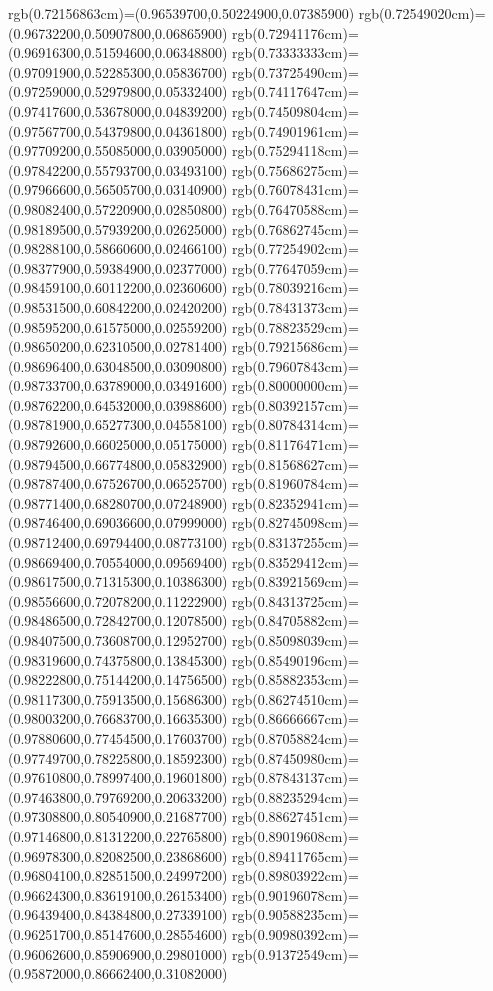 {{rgb(0.72156863cm)=(0.96539700,0.50224900,0.07385900)
rgb(0.72549020cm)=(0.96732200,0.50907800,0.06865900)
rgb(0.72941176cm)=(0.96916300,0.51594600,0.06348800)
rgb(0.73333333cm)=(0.97091900,0.52285300,0.05836700)
rgb(0.73725490cm)=(0.97259000,0.52979800,0.05332400)
rgb(0.74117647cm)=(0.97417600,0.53678000,0.04839200)
rgb(0.74509804cm)=(0.97567700,0.54379800,0.04361800)
rgb(0.74901961cm)=(0.97709200,0.55085000,0.03905000)
rgb(0.75294118cm)=(0.97842200,0.55793700,0.03493100)
rgb(0.75686275cm)=(0.97966600,0.56505700,0.03140900)
rgb(0.76078431cm)=(0.98082400,0.57220900,0.02850800)
rgb(0.76470588cm)=(0.98189500,0.57939200,0.02625000)
rgb(0.76862745cm)=(0.98288100,0.58660600,0.02466100)
rgb(0.77254902cm)=(0.98377900,0.59384900,0.02377000)
rgb(0.77647059cm)=(0.98459100,0.60112200,0.02360600)
rgb(0.78039216cm)=(0.98531500,0.60842200,0.02420200)
rgb(0.78431373cm)=(0.98595200,0.61575000,0.02559200)
rgb(0.78823529cm)=(0.98650200,0.62310500,0.02781400)
rgb(0.79215686cm)=(0.98696400,0.63048500,0.03090800)
rgb(0.79607843cm)=(0.98733700,0.63789000,0.03491600)
rgb(0.80000000cm)=(0.98762200,0.64532000,0.03988600)
rgb(0.80392157cm)=(0.98781900,0.65277300,0.04558100)
rgb(0.80784314cm)=(0.98792600,0.66025000,0.05175000)
rgb(0.81176471cm)=(0.98794500,0.66774800,0.05832900)
rgb(0.81568627cm)=(0.98787400,0.67526700,0.06525700)
rgb(0.81960784cm)=(0.98771400,0.68280700,0.07248900)
rgb(0.82352941cm)=(0.98746400,0.69036600,0.07999000)
rgb(0.82745098cm)=(0.98712400,0.69794400,0.08773100)
rgb(0.83137255cm)=(0.98669400,0.70554000,0.09569400)
rgb(0.83529412cm)=(0.98617500,0.71315300,0.10386300)
rgb(0.83921569cm)=(0.98556600,0.72078200,0.11222900)
rgb(0.84313725cm)=(0.98486500,0.72842700,0.12078500)
rgb(0.84705882cm)=(0.98407500,0.73608700,0.12952700)
rgb(0.85098039cm)=(0.98319600,0.74375800,0.13845300)
rgb(0.85490196cm)=(0.98222800,0.75144200,0.14756500)
rgb(0.85882353cm)=(0.98117300,0.75913500,0.15686300)
rgb(0.86274510cm)=(0.98003200,0.76683700,0.16635300)
rgb(0.86666667cm)=(0.97880600,0.77454500,0.17603700)
rgb(0.87058824cm)=(0.97749700,0.78225800,0.18592300)
rgb(0.87450980cm)=(0.97610800,0.78997400,0.19601800)
rgb(0.87843137cm)=(0.97463800,0.79769200,0.20633200)
rgb(0.88235294cm)=(0.97308800,0.80540900,0.21687700)
rgb(0.88627451cm)=(0.97146800,0.81312200,0.22765800)
rgb(0.89019608cm)=(0.96978300,0.82082500,0.23868600)
rgb(0.89411765cm)=(0.96804100,0.82851500,0.24997200)
rgb(0.89803922cm)=(0.96624300,0.83619100,0.26153400)
rgb(0.90196078cm)=(0.96439400,0.84384800,0.27339100)
rgb(0.90588235cm)=(0.96251700,0.85147600,0.28554600)
rgb(0.90980392cm)=(0.96062600,0.85906900,0.29801000)
rgb(0.91372549cm)=(0.95872000,0.86662400,0.31082000)
}}
